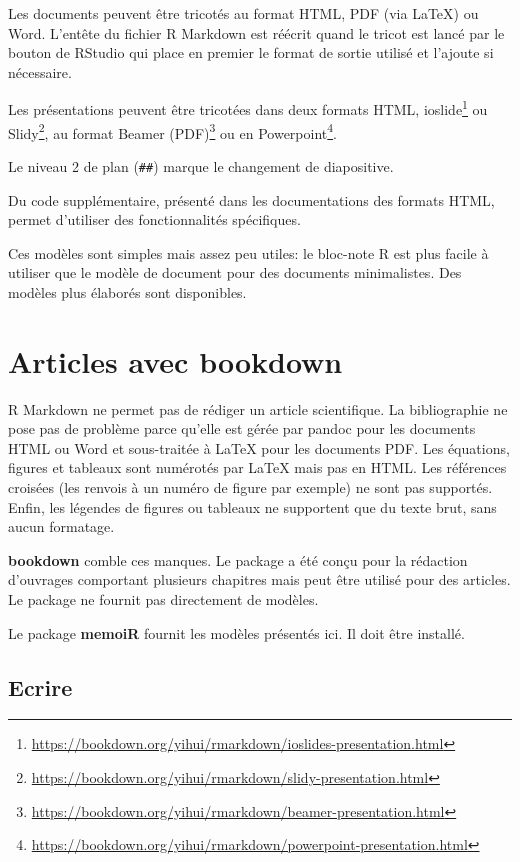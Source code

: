 \documentclass[
  12pt,
  french,
  a4paper,
  extrafontsizes,onecolumn,openright
  ]{memoir}
\begin{document}
Les documents peuvent être tricotés au format HTML, PDF (via LaTeX) ou Word.
L'entête du fichier R Markdown est réécrit quand le tricot est lancé par le bouton de RStudio qui place en premier le format de sortie utilisé et l'ajoute si nécessaire.

Les présentations peuvent être tricotées dans deux formats HTML, ioslide\footnote{\url{https://bookdown.org/yihui/rmarkdown/ioslides-presentation.html}} ou Slidy\footnote{\url{https://bookdown.org/yihui/rmarkdown/slidy-presentation.html}}, au format Beamer (PDF)\footnote{\url{https://bookdown.org/yihui/rmarkdown/beamer-presentation.html}} ou en Powerpoint\footnote{\url{https://bookdown.org/yihui/rmarkdown/powerpoint-presentation.html}}.

Le niveau 2 de plan (\texttt{\#\#}) marque le changement de diapositive.

Du code supplémentaire, présenté dans les documentations des formats HTML, permet d'utiliser des fonctionnalités spécifiques.

Ces modèles sont simples mais assez peu utiles: le bloc-note R est plus facile à utiliser que le modèle de document pour des documents minimalistes.
Des modèles plus élaborés sont disponibles.

\hypertarget{articles-avec-bookdown}{%
\section{Articles avec bookdown}\label{articles-avec-bookdown}}

R Markdown ne permet pas de rédiger un article scientifique.
La bibliographie ne pose pas de problème parce qu'elle est gérée par pandoc pour les documents HTML ou Word et sous-traitée à LaTeX pour les documents PDF.
Les équations, figures et tableaux sont numérotés par LaTeX mais pas en HTML.
Les références croisées (les renvois à un numéro de figure par exemple) ne sont pas supportés.
Enfin, les légendes de figures ou tableaux ne supportent que du texte brut, sans aucun formatage.

\textbf{bookdown} comble ces manques.
Le package a été conçu pour la rédaction d'ouvrages comportant plusieurs chapitres mais peut être utilisé pour des articles.
Le package ne fournit pas directement de modèles.

Le package \textbf{memoiR} fournit les modèles présentés ici.
Il doit être installé.

\hypertarget{ecrire}{%
\subsection{Ecrire}\label{ecrire}}
\end{document}
